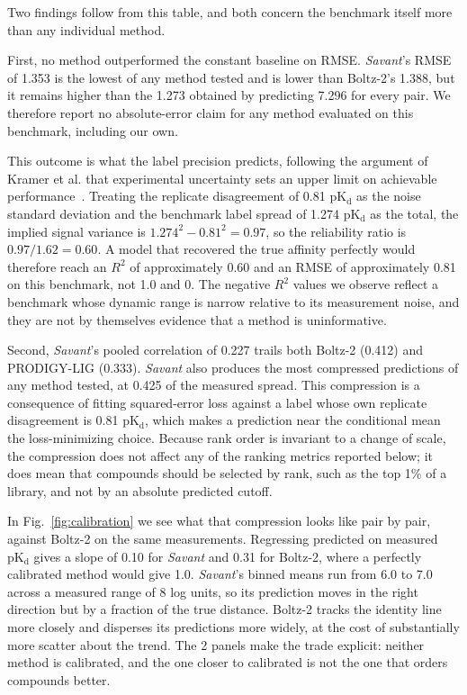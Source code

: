 \documentclass[times, twoside]{zHenriquesLab-StyleBioRxiv}
\newcommand{\savant}{\textit{Savant}\xspace}
\newcommand{\pkd}{\ensuremath{\mathrm{pK_d}}\xspace}
\begin{document}
Two findings follow from this table, and both concern the benchmark itself more than any individual method.

First, no method outperformed the constant baseline on RMSE. \savant's RMSE of 1.353 is the lowest of any method tested and is lower than Boltz-2's 1.388, but it remains higher than the 1.273 obtained by predicting 7.296 for every pair. We therefore report no absolute-error claim for any method evaluated on this benchmark, including our own.

This outcome is what the label precision predicts, following the argument of Kramer et al. that experimental uncertainty sets an upper limit on achievable performance~\cite{kramer2012uncertainty}. Treating the replicate disagreement of 0.81 \pkd as the noise standard deviation and the benchmark label spread of 1.274 \pkd as the total, the implied signal variance is $1.274^2 - 0.81^2 = 0.97$, so the reliability ratio is $0.97/1.62 = 0.60$. A model that recovered the true affinity perfectly would therefore reach an $R^2$ of approximately 0.60 and an RMSE of approximately 0.81 on this benchmark, not 1.0 and 0. The negative $R^2$ values we observe reflect a benchmark whose dynamic range is narrow relative to its measurement noise, and they are not by themselves evidence that a method is uninformative.

Second, \savant's pooled correlation of 0.227 trails both Boltz-2 (0.412) and PRODIGY-LIG (0.333). \savant also produces the most compressed predictions of any method tested, at 0.425 of the measured spread. This compression is a consequence of fitting squared-error loss against a label whose own replicate disagreement is 0.81 \pkd, which makes a prediction near the conditional mean the loss-minimizing choice. Because rank order is invariant to a change of scale, the compression does not affect any of the ranking metrics reported below; it does mean that compounds should be selected by rank, such as the top 1\% of a library, and not by an absolute predicted cutoff.

In Fig.~\ref{fig:calibration} we see what that compression looks like pair by pair, against Boltz-2 on the same measurements. Regressing predicted on measured \pkd{} gives a slope of 0.10 for \savant and 0.31 for Boltz-2, where a perfectly calibrated method would give 1.0. \savant's binned means run from 6.0 to 7.0 across a measured range of 8 log units, so its prediction moves in the right direction but by a fraction of the true distance. Boltz-2 tracks the identity line more closely and disperses its predictions more widely, at the cost of substantially more scatter about the trend. The 2 panels make the trade explicit: neither method is calibrated, and the one closer to calibrated is not the one that orders compounds better.
\end{document}
